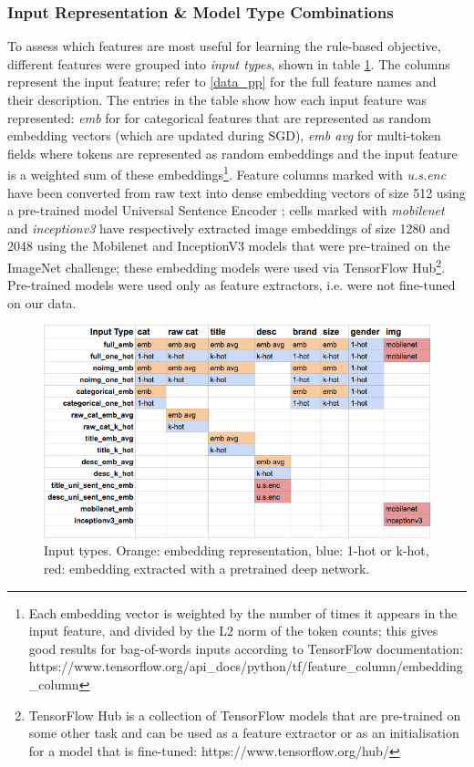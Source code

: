 \subsubsection{Input Representation \& Model Type Combinations}
\label{model_comb}

To assess which features are most useful for learning the rule-based objective, different features were grouped into \textit{input types}, shown in table \ref{input_types}.
The columns represent the input feature; refer to \ref{data_pp} for the full feature names and their description.
The entries in the table show how each input feature was represented: \textit{emb} for for categorical features that are represented as random embedding vectors (which are updated during SGD), \textit{emb avg} for multi-token fields where tokens are represented as random embeddings and the input feature is a weighted sum of these embeddings\footnote{Each embedding vector is weighted by the number of times it appears in the input feature, and divided by the L2 norm of the token counts; this gives good results for bag-of-words inputs according to TensorFlow documentation:
\newline
https://www.tensorflow.org/api\_docs/python/tf/feature\_column/embedding\_column}.
Feature columns marked with \textit{u.s.enc} have been converted from raw text into dense embedding vectors of size 512 using a pre-trained model Universal Sentence Encoder \cite{uni_sent_enc}; cells marked with \textit{mobilenet} and \textit{inceptionv3} have respectively extracted image embeddings of size 1280 and 2048 using the Mobilenet \cite{mobilenet} and InceptionV3 \cite{inceptionv3} models that were pre-trained on the ImageNet challenge; these embedding models were used via TensorFlow Hub\footnote{TensorFlow Hub is a collection of TensorFlow models that are pre-trained on some other task and can be used as a feature extractor or as an initialisation for a model that is fine-tuned: https://www.tensorflow.org/hub/}.
Pre-trained models were used only as feature extractors, i.e. were not fine-tuned on our data.

\begin{figure}
  \centering
  \includegraphics[width=\linewidth]{figures/input_types}
  \caption{Input types. Orange: embedding representation, blue: 1-hot or k-hot, red: embedding extracted with a pretrained deep network.}
  \label{input_types}
\end{figure}

